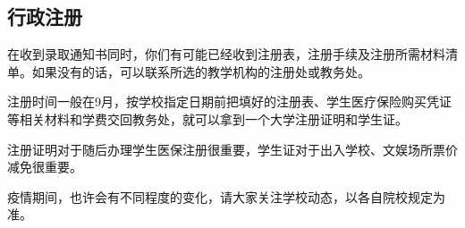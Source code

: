 \subsection{行政注册}
在收到录取通知书同时，你们有可能已经收到注册表，注册手续及注册所需材料清单。如果没有的话，可以联系所选的教学机构的注册处或教务处。

注册时间一般在9月，按学校指定日期前把填好的注册表、学生医疗保险购买凭证等相关材料和学费交回教务处，就可以拿到一个大学注册证明和学生证。

注册证明对于随后办理学生医保注册很重要，学生证对于出入学校、文娱场所票价减免很重要。

疫情期间，也许会有不同程度的变化，请大家关注学校动态，以各自院校规定为准。
